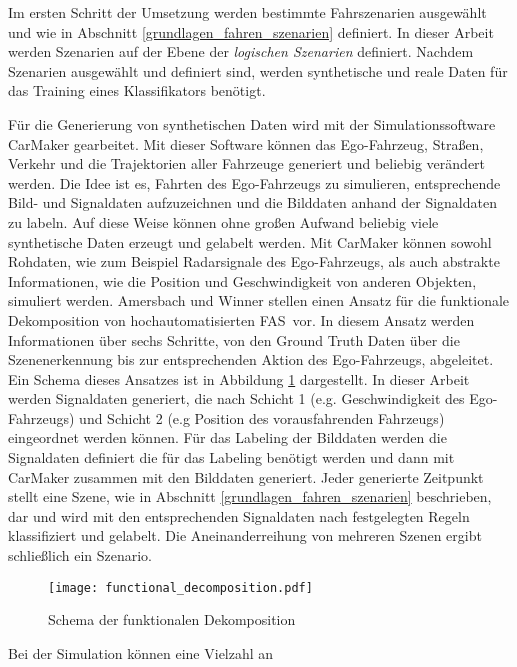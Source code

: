 Im ersten Schritt der Umsetzung werden bestimmte Fahrszenarien ausgewählt und wie in Abschnitt \ref{grundlagen_fahren_szenarien} definiert. In dieser Arbeit werden Szenarien auf der Ebene der \textit{logischen Szenarien} definiert. Nachdem Szenarien ausgewählt und definiert sind, werden synthetische und reale Daten für das Training eines Klassifikators benötigt.

Für die Generierung von synthetischen Daten wird mit der Simulationssoftware CarMaker gearbeitet. Mit dieser Software können das Ego-Fahrzeug, Straßen, Verkehr und die Trajektorien aller Fahrzeuge generiert und beliebig verändert werden. Die Idee ist es, Fahrten des Ego-Fahrzeugs zu simulieren, entsprechende Bild- und Signaldaten aufzuzeichnen und die Bilddaten anhand der Signaldaten zu labeln. Auf diese Weise können ohne großen Aufwand beliebig viele synthetische Daten erzeugt und gelabelt werden. Mit CarMaker können sowohl Rohdaten, wie zum Beispiel Radarsignale des Ego-Fahrzeugs, als auch abstrakte Informationen, wie die Position und Geschwindigkeit von anderen Objekten, simuliert werden. Amersbach und Winner \cite{amersbach2017functional} stellen einen Ansatz für die funktionale Dekomposition von hochautomatisierten \ac{FAS} vor. In diesem Ansatz werden Informationen über sechs Schritte, von den Ground Truth Daten über die Szenenerkennung bis zur entsprechenden Aktion des Ego-Fahrzeugs, abgeleitet. Ein Schema dieses Ansatzes ist in Abbildung \ref{fig_functional_decomposition} dargestellt. In dieser Arbeit werden Signaldaten generiert, die nach Schicht 1 (e.g. Geschwindigkeit des Ego-Fahrzeugs) und Schicht 2 (e.g Position des vorausfahrenden Fahrzeugs) eingeordnet werden können. Für das Labeling der Bilddaten werden die Signaldaten definiert die für das Labeling benötigt werden und dann mit CarMaker zusammen mit den Bilddaten generiert. Jeder generierte Zeitpunkt stellt eine Szene, wie in Abschnitt \ref{grundlagen_fahren_szenarien} beschrieben, dar und wird mit den entsprechenden Signaldaten nach festgelegten Regeln klassifiziert und gelabelt. Die Aneinanderreihung von mehreren Szenen ergibt schließlich ein Szenario.

\begin{figure}[h]
\centering
\texttt{[image: functional\_decomposition.pdf]}
\caption{Schema der funktionalen Dekomposition \cite{amersbach2017functional}}
\label{fig_functional_decomposition}
\end{figure}

 Bei der Simulation können eine Vielzahl an 





